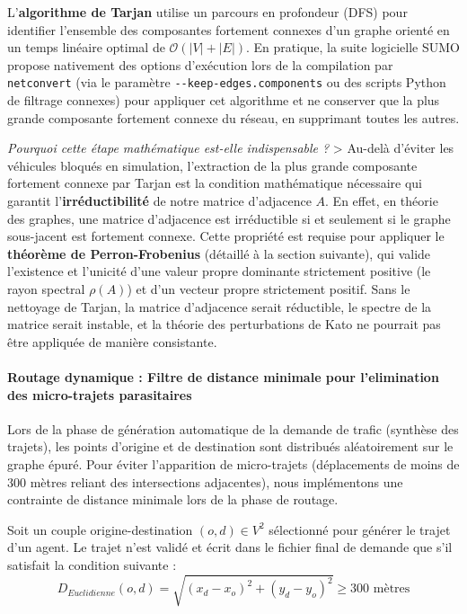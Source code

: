 \documentclass[10pt, a4paper]{article}
\begin{document}
L'\textbf{algorithme de Tarjan} utilise un parcours en profondeur (DFS)
pour identifier l'ensemble des composantes fortement connexes d'un
graphe orienté en un temps linéaire optimal de
\(\mathcal{O}(|V| + |E|)\). En pratique, la suite logicielle SUMO
propose nativement des options d'exécution lors de la compilation par
\texttt{netconvert} (via le paramètre \texttt{-\/-keep-edges.components}
ou des scripts Python de filtrage connexes) pour appliquer cet
algorithme et ne conserver que la plus grande composante fortement
connexe du réseau, en supprimant toutes les autres.

\emph{Pourquoi cette étape mathématique est-elle indispensable ?}
\textgreater{} Au-delà d'éviter les véhicules bloqués en simulation,
l'extraction de la plus grande composante fortement connexe par Tarjan
est la condition mathématique nécessaire qui garantit
l'\textbf{irréductibilité} de notre matrice d'adjacence \(A\). En effet,
en théorie des graphes, une matrice d'adjacence est irréductible si et
seulement si le graphe sous-jacent est fortement connexe. Cette
propriété est requise pour appliquer le \textbf{théorème de
Perron-Frobenius} (détaillé à la section suivante), qui valide
l'existence et l'unicité d'une valeur propre dominante strictement
positive (le rayon spectral \(\rho(A)\)) et d'un vecteur propre
strictement positif. Sans le nettoyage de Tarjan, la matrice d'adjacence
serait réductible, le spectre de la matrice serait instable, et la
théorie des perturbations de Kato ne pourrait pas être appliquée de
manière consistante.

\paragraph{Routage dynamique : Filtre de distance minimale pour
l'elimination des micro-trajets
parasitaires}\label{routage-dynamique-filtre-de-distance-minimale-pour-lelimination-des-micro-trajets-parasitaires}

Lors de la phase de génération automatique de la demande de trafic
(synthèse des trajets), les points d'origine et de destination sont
distribués aléatoirement sur le graphe épuré. Pour éviter l'apparition
de micro-trajets (déplacements de moins de 300 mètres reliant des
intersections adjacentes), nous implémentons une contrainte de distance
minimale lors de la phase de routage.

Soit un couple origine-destination \((o, d) \in V^2\) sélectionné pour
générer le trajet d'un agent. Le trajet n'est validé et écrit dans le
fichier final de demande que s'il satisfait la condition suivante :
\[D_{Euclidienne}(o, d) = \sqrt{(x_d - x_o)^2 + (y_d - y_o)^2} \ge 300 \text{ mètres}\]
\end{document}
